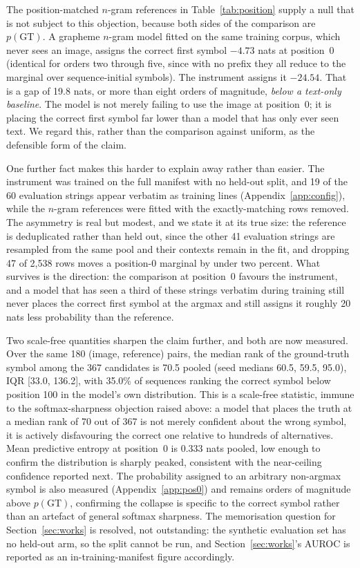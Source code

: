 \documentclass{article}
\begin{document}
The position-matched $n$-gram references in Table~\ref{tab:position} supply a null that is not
subject to this objection, because both sides of the comparison are $p(\mathrm{GT})$. A
grapheme $n$-gram model fitted on the same training corpus, which never sees an image, assigns
the correct first symbol $-4.73$ nats at position~0 (identical for orders two through five,
since with no prefix they all reduce to the marginal over sequence-initial symbols). The
instrument assigns it $-24.54$. That is a gap of 19.8 nats, or more than eight orders of
magnitude, \emph{below a text-only baseline}. The model is not merely failing to use the image
at position~0; it is placing the correct first symbol far lower than a model that has only ever
seen text. We regard this, rather than the comparison against uniform, as the defensible form
of the claim.

One further fact makes this harder to explain away rather than easier. The instrument was
trained on the full manifest with no held-out split, and 19 of the 60 evaluation strings appear
verbatim as training lines (Appendix~\ref{app:config}), while the $n$-gram references were
fitted with the exactly-matching rows removed. The asymmetry is real but modest, and we state it
at its true size: the reference is deduplicated rather than held out, since the other 41
evaluation strings are resampled from the same pool and their contexts remain in the fit, and
dropping 47 of 2{,}538 rows moves a position-0 marginal by under two percent. What survives is
the direction: the comparison at position~0 favours the instrument, and a model that has seen a
third of these strings verbatim during training still never places the correct first symbol at
the argmax and still assigns it roughly 20 nats less probability than the reference.

Two scale-free quantities sharpen the claim further, and both are now measured. Over the same
180 (image, reference) pairs, the median rank of the ground-truth symbol among the 367
candidates is 70.5 pooled (seed medians 60.5, 59.5, 95.0), IQR [33.0, 136.2], with 35.0\% of
sequences ranking the correct symbol below position 100 in the model's own distribution. This
is a scale-free statistic, immune to the softmax-sharpness objection raised above: a model that
places the truth at a median rank of 70 out of 367 is not merely confident about the wrong
symbol, it is actively disfavouring the correct one relative to hundreds of alternatives. Mean
predictive entropy at position~0 is 0.333 nats pooled, low enough to confirm the distribution is
sharply peaked, consistent with the near-ceiling confidence reported next. The probability
assigned to an arbitrary non-argmax symbol is also measured (Appendix~\ref{app:pos0}) and
remains orders of magnitude above $p(\mathrm{GT})$, confirming the collapse is specific to the
correct symbol rather than an artefact of general softmax sharpness. The memorisation question
for Section~\ref{sec:works} is resolved, not outstanding: the synthetic evaluation set has no
held-out arm, so the split cannot be run, and Section~\ref{sec:works}'s AUROC is reported as an
in-training-manifest figure accordingly.
\end{document}
